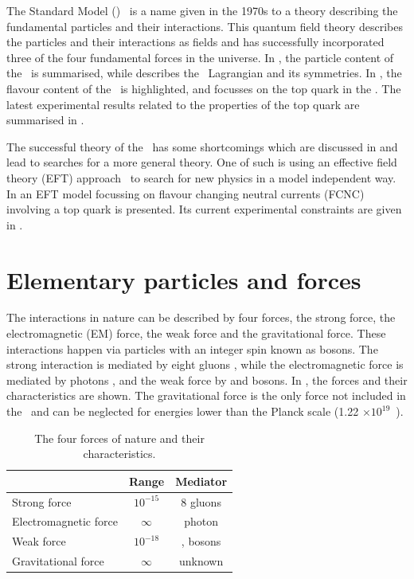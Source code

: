 The Standard Model (\SM)~\cite{Peskin:257493} 
is a name given in the 1970s to a theory describing the fundamental particles and their interactions. This quantum field theory describes the particles and their interactions as fields and has successfully incorporated three of the four fundamental forces in the universe. In , the particle content of the \SM\ is summarised, while  describes  the \SM\ Lagrangian and its symmetries. In , the flavour content of the \SM\ is highlighted, and  focusses on the top quark in the \SM. The latest experimental results related to the properties of the top quark are summarised in . 

The successful theory of the \SM\ has some shortcomings which are discussed in  and lead to searches for a more general theory. One of such  is using  an effective field theory (EFT) approach~\cite{Burgess:2007pt}  to search for new physics in a model independent way. In  an EFT model focussing on flavour changing neutral currents (FCNC) involving a top quark is presented. Its current experimental constraints are given in .



\section{Elementary particles and forces}
\label{sec:SMcontent}
The interactions in nature can be described by four forces, the strong force, the electromagnetic (EM) force, the weak force and the gravitational force. These interactions happen via particles with an integer spin known as bosons. The strong interaction is mediated by eight gluons \Pgluon, while the electromagnetic force is mediated by photons \Pphoton, and the weak force by \PZ and \PWpm bosons. In , the forces and their characteristics are shown. The gravitational force is the only force not included in the \SM\ and can be neglected for energies lower than the Planck scale (1.22 $\times 10^{19}$~\GeV).
\begin{table}[htbp]
	\centering
	\caption{The four forces of nature and their characteristics.}
	\begin{tabular}{lcc}
		\toprule
		& Range & Mediator \\ 
		\midrule
		Strong force & $10^{-15}$ \m & 8 gluons  \\ 
	
		Electromagnetic force & $\infty$ & photon  \\ 
		 
		Weak force & $10^{-18}$ \m & \PWpm, \PZ bosons \\ 
		
		Gravitational force & $\infty$ & unknown \\ 
		\bottomrule
	\end{tabular} 
	\label{tab:forces}
\end{table}

